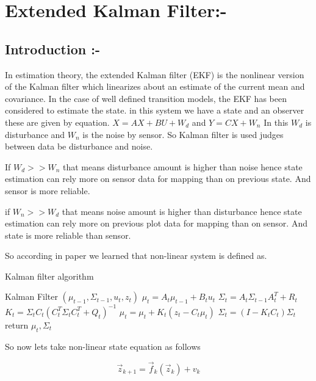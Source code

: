 \section{Extended Kalman Filter:-}
\label{Spline_1}

\subsection{Introduction :-}
In estimation theory, the extended Kalman filter (EKF) is the nonlinear version of the Kalman filter which linearizes about an estimate of the current mean and covariance. In the case of well defined transition models, the EKF has been considered to estimate the state. 
in this system we have a state and an observer these are given by equation.
$ X=AX +BU + W_d $  and $ Y=CX + W_n $
In this $ W_d $ is disturbance and $ W_n $ is the noise by sensor.
So Kalman filter is used judges between data be disturbance and noise.

If $W_d >> W_n$ that means disturbance amount is higher than noise hence state estimation can rely more on sensor data for mapping than on previous state. And sensor is more reliable.

if $W_n >> W_d$ that means noise amount is higher than disturbance hence state estimation can rely more on previous plot data for mapping than on sensor. And state is more reliable than sensor.

So according in paper we learned that non-linear system is defined as.



\begin{algorithm}
\caption{Kalman filter algorithm}\label{alg-gd}
\begin{algorithmic}[1]
\State Kalman Filter \({(\mu_{t-1},\Sigma_{t-1},u_t,z_t)}\)
\State \( {\mu_{t}}=A_t \mu_{t-1} + B_t u_t \)
\State \( \Sigma_{t}=A_t \Sigma_{t-1} A_t^T +R_t\)
\State \( K_t = \Sigma_{t} C_t(C_t^T \Sigma_{t}C_t^T+Q_t)^{-1}\)
\State \( \mu_{t}=\mu_{t}+K_t(z_t-C_t \mu_t) \)
\State \(\Sigma_{t}=(I-K_t C_t)\Sigma_{t}\)
\State return \( \mu_t ,  \Sigma_t \)
\end{algorithmic}
\end{algorithm}

So now lets take non-linear state equation as follows

\begin{equation}
\overrightarrow{z}_{k+1}= \overrightarrow{f}_k (\overrightarrow{z}_k) + v_k 
\end{equation}

